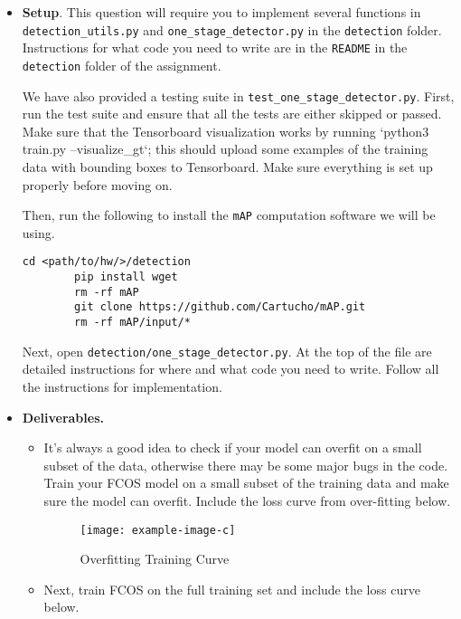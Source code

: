 \documentclass[11pt,addpoints,answers]{exam}
\numberwithin{equation}{section} %
\numberwithin{figure}{section} %
\numberwithin{table}{section} %
\begin{document}
\begin{itemize}
    \item \textbf{Setup}. This question will require you to implement several functions in \texttt{detection\_utils.py} and \texttt{one\_stage\_detector.py} in the \texttt{detection} folder. Instructions for what code you need to write are in the \texttt{README} in the \texttt{detection} folder of the assignment.
    
    We have also provided a testing suite in \texttt{test\_one\_stage\_detector.py}. First, run the test suite
    and ensure that all the tests are either skipped or passed. Make sure that the Tensorboard visualization works by running `python3 train.py --visualize\_gt`; this should upload some examples of the training data with bounding boxes to Tensorboard. Make sure everything is set up properly before moving on.

    Then, run the following to install the \texttt{mAP} computation software we will be using.
    \begin{lstlisting}[language=Shell]
        cd <path/to/hw/>/detection
        pip install wget  
        rm -rf mAP
        git clone https://github.com/Cartucho/mAP.git
        rm -rf mAP/input/*
    \end{lstlisting}

    Next, open \texttt{detection/one\_stage\_detector.py}. At the top of the file are detailed
    instructions for where and what code you need to write. Follow all the instructions for implementation. 

    \item \textbf{Deliverables.}
    \begin{itemize}
        \item It's always a good idea to check if your model can overfit on a small subset of the data, otherwise there may be some major bugs in the code. Train your FCOS model on a small subset of the training data and make sure the model can overfit. Include the loss curve from over-fitting below.

        \begin{figure}[H]
            \centering
            \texttt{[image: example-image-c]}
            \caption{Overfitting Training Curve}
            \label{fig:overfit_plot}
        \end{figure}
        
        \item Next, train FCOS on the full training set and include the loss curve below.


\end{itemize}
\end{itemize}
\end{document}
